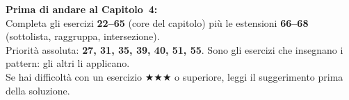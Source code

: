 \begin{workbook}
\textbf{Prima di andare al Capitolo~4:}\\[4pt]
Completa gli esercizi \textbf{22--65} (core del capitolo) più le
estensioni \textbf{66--68} (sottolista, raggruppa, intersezione).\\[4pt]
Priorità assoluta: \textbf{27, 31, 35, 39, 40, 51, 55}.
Sono gli esercizi che insegnano i pattern: gli altri li applicano.\\[4pt]
Se hai difficoltà con un esercizio $\bigstar\bigstar\bigstar$ o superiore, leggi il
suggerimento prima della soluzione.
\end{workbook}
